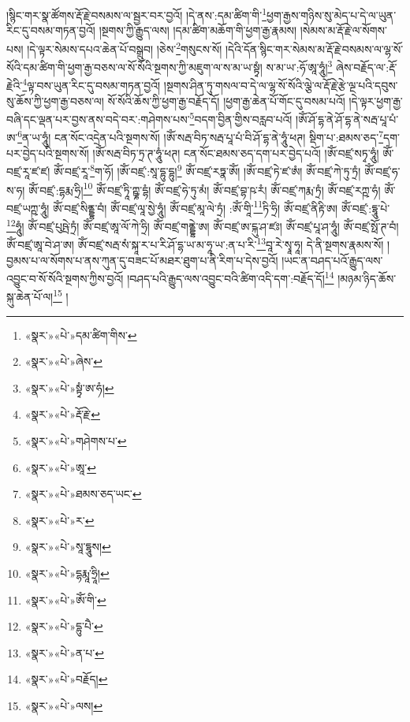 །སྙིང་གར་སྣ་ཚོགས་རྡོ་རྗེ་བསམས་ལ་སྦྱར་བར་བྱའོ། །དེ་ནས་:དམ་ཚིག་གི་\footnote{«སྣར་»«པེ་»དམ་ཚིག་གིས་}ཕྱག་རྒྱས་གཉིས་སུ་མེད་པ་དེ་ལ་ཡུན་རིང་དུ་བསམ་གཏན་བྱའོ། །སྔགས་ཀྱི་རྒྱུད་ལས། །དམ་ཚིག་མཆོག་གི་ཕྱག་རྒྱ་རྣམས། །སེམས་མ་རྡོ་རྗེ་ལ་སོགས་པས། །དེ་ལྟར་སེམས་དཔའ་ཆེན་པོ་བསྒྲུབ། །ཅེས་\footnote{«སྣར་»«པེ་»ཞེས་}གསུངས་སོ། །དེའི་དོན་སྙིང་གར་སེམས་མ་རྡོ་རྗེ་བསམས་ལ་ལྷ་སོ་སོའི་དམ་ཚིག་གི་ཕྱག་རྒྱ་བཅས་ལ་སོ་སོའི་སྔགས་ཀྱི་མཇུག་ལ་ས་མ་ཡ་སྟྭཾ། ས་མ་ཡ་:ཧོ་ཨཱ་ཧཱུཾ།\footnote{«སྣར་»«པེ་»སྟྭཾ་ཨ་ཧཾ།} ཞེས་བརྗོད་ལ་:རྡོ་རྗེའི་\footnote{«སྣར་»«པེ་»རྡོ་རྗེ་}ལྟ་བས་ཡུན་རིང་དུ་བསམ་གཏན་བྱའོ། །སྔགས་ཤིན་ཏུ་གསལ་བ་དེ་ལ་ལྷ་སོ་སོའི་ལྕེ་ལ་རྡོ་རྗེ་རྩེ་ལྔ་པའི་དབུས་སུ་ཆོས་ཀྱི་ཕྱག་རྒྱ་བཅས་ལ། སོ་སོའི་ཆོས་ཀྱི་ཕྱག་རྒྱ་བརྗོད་དོ། །ཕྱག་རྒྱ་ཆེན་པོ་གོང་དུ་བསམ་པའོ། །དེ་ལྟར་ཕྱག་རྒྱ་བཞི་དང་ལྡན་པར་བྱས་ནས་བདེ་བར་:གཤེགས་པས་\footnote{«སྣར་»«པེ་»གཤེགས་པ་}བདག་བྱིན་གྱིས་བརླབ་པའོ། །ཨོཾ་ཤོ་དྷ་ནེ་ཤོ་དྷ་ནེ་སརྦ་པཱ་པཾ་ཨ་\footnote{«སྣར་»«པེ་»ཨཱ་}ན་ཡ་ཧཱུཾ། ངན་སོང་འདྲེན་པའི་སྔགས་སོ། །ཨོཾ་སརྦ་བིཏ་སརྦ་པཱ་པཾ་བི་ཤོ་དྷ་ནེ་ཧཱུཾ་ཕཊ། སྡིག་པ་:ཐམས་ཅད་\footnote{«སྣར་»«པེ་»ཐམས་ཅད་ཡང་}དག་པར་བྱེད་པའི་སྔགས་སོ། །ཨོཾ་སརྦ་བིཏ་ཏྲ་ཊ་ཧཱུཾ་ཕཊ། ངན་སོང་ཐམས་ཅད་དག་པར་བྱེད་པའོ། །ཨོཾ་བཛྲ་སཏྭ་ཧཱུཾ། ཨོཾ་བཛྲ་རཱ་ཛ་ཛ། ཨོཾ་བཛྲ་རཱ་\footnote{«སྣར་»«པེ་»ར་}ག་ཧོ། །ཨོཾ་བཛྲ་:སཱ་དྷུ་དྷུ།\footnote{«སྣར་»«པེ་»སཱ་དྷཱུས།} ཨོཾ་བཛྲ་རཏྣ་ཨོཾ། །ཨོཾ་བཛྲ་ཏེ་ཛ་ཨཾ། ཨོཾ་བཛྲ་ཀེ་ཏུ་ཏྲཾ། ཨོཾ་བཛྲ་ཧ་ས་ཧ། ཨོཾ་བཛྲ་:དྷརྨ་ཧྲི།\footnote{«སྣར་»«པེ་»དྷརྨཱ་ཧྲཱི།} ཨོཾ་བཛྲ་ཏཱི་ཀྵྞ་དྷཾ། ཨོཾ་བཛྲ་ཧེ་ཏུ་མཾ། ཨོཾ་བཛྲ་བྷ་ཥ་རཾ། ཨོཾ་བཛྲ་ཀརྨ་ཏྲཾ། ཨོཾ་བཛྲ་རཀྵ་ཧཾ། ཨོཾ་བཛྲ་ཡཀྵ་ཧཱུཾ། ཨོཾ་བཛྲ་སིནྡྷ་བཾ། ཨོཾ་བཛྲ་ལཱ་སྱེ་ཧཱུཾ། ཨོཾ་བཛྲ་མཱ་ལེ་ཏྲཾ། :ཨོཾ་གཱི་\footnote{«སྣར་»«པེ་»ཨོཾ་གི་}ཏི་ཧྲི། ཨོཾ་བཛྲ་ནིརྟི་ཨ། ཨོཾ་བཛྲ་:དྷཱུ་པེ་\footnote{«སྣར་»«པེ་»དྷུ་པཻ་}ཧཱུཾ། ཨོཾ་བཛྲ་པུཥྤེ་ཏྲཾ། ཨོཾ་བཛྲ་ཨཱ་ལོ་ཀེ་ཧྲི། ཨོཾ་བཛྲ་གནྡྷེ་ཨ། ཨོཾ་བཛྲ་ཨ་ངྐུ་ཤ་ཛཿ། ཨོཾ་བཛྲ་པཱ་ཤ་ཧཱུཾ། ཨོཾ་བཛྲ་སྥོ་ཊ་བཾ། ཨོཾ་བཛྲ་ཨཱ་བེ་ཤ་ཨ། ཨོཾ་བཛྲ་སརྦ་སཾ་སྐཱ་ར་པ་རི་ཤོ་དྷ་ཡ་མ་ཧཱ་ཡ་:ན་པ་རི་\footnote{«སྣར་»«པེ་»ན་པ་}བཱ་རེ་སྭཱ་ཧཱ། དེ་ནི་སྔགས་རྣམས་སོ། །བྱམས་པ་ལ་སོགས་པ་ནས་ཀུན་དུ་བཟང་པོ་མཐར་ཐུག་པ་ནི་རིག་པ་དེས་བྱའོ། །ཡང་ན་བཤད་པའོ་རྒྱུད་ལས་འབྱུང་བ་སོ་སོའི་སྔགས་ཀྱིས་བྱའོ། །བཤད་པའི་རྒྱུད་ལས་འབྱུང་བའི་ཚིག་འདི་དག་:བརྗོད་དོ།\footnote{«སྣར་»«པེ་»བརྗོད།} །མཉམ་ཉིད་ཆོས་སྐུ་ཆེན་པོ་ལ།\footnote{«སྣར་»«པེ་»ལས།} །
